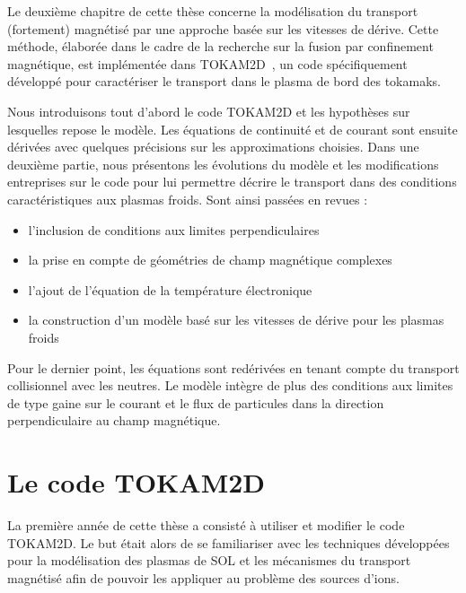 \begin{refsection}
Le deuxième chapitre de cette thèse concerne la modélisation du transport
(fortement) magnétisé par une approche basée sur les vitesses de dérive. Cette
méthode, élaborée dans le cadre de la recherche sur la fusion par
confinement magnétique, est implémentée dans TOKAM2D~\cite{Sarazin}, un code 
spécifiquement développé pour caractériser le transport dans le plasma de bord
des tokamaks.

Nous introduisons tout d'abord le code TOKAM2D et les hypothèses sur
lesquelles repose le modèle. Les équations de continuité et de
courant sont ensuite dérivées avec quelques précisions sur les approximations
choisies.
Dans une deuxième partie, nous présentons les évolutions du
modèle et les modifications entreprises sur le code pour lui
permettre décrire le transport dans des conditions caractéristiques aux plasmas
froids. Sont ainsi passées en revues :

\begin{itemize}
  \item l'inclusion de conditions aux limites
perpendiculaires
\item la prise en compte de géométries de champ magnétique complexes
\item l'ajout de l'équation de la
température électronique
\item la construction d'un modèle basé sur les vitesses de dérive pour les plasmas froids
\end{itemize}

Pour le dernier point, les équations sont redérivées en tenant
compte du transport collisionnel avec les neutres. Le modèle intègre de plus des
conditions aux limites de type gaine sur le courant et le flux de particules
dans la direction perpendiculaire au champ magnétique.

\section{Le code TOKAM2D}

La première année de cette thèse a consisté à utiliser et modifier le
code {TOKAM2D}. Le but était alors de se familiariser avec les
techniques développées pour la modélisation des plasmas
de SOL et les mécanismes du transport magnétisé afin
de pouvoir les appliquer au problème des sources d'ions. 


\end{refsection}
